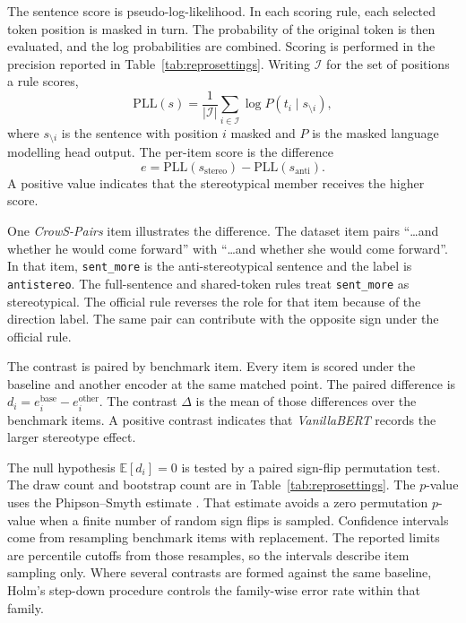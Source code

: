 \documentclass[sigconf,natbib=true,anonymous=true]{acmart}
\begin{document}
The sentence score is pseudo-log-likelihood. In each scoring rule, each selected
token position is masked in turn. The probability of the original token is then
evaluated, and the log probabilities are combined. Scoring is performed in the
precision reported in Table~\ref{tab:reprosettings}. Writing $\mathcal{I}$ for
the set of positions a rule scores,
%
\begin{equation}
\mathrm{PLL}(s) = \frac{1}{|\mathcal{I}|}
                  \sum_{i \in \mathcal{I}} \log P\!\left(t_i \mid s_{\setminus i}\right),
\end{equation}
%
where $s_{\setminus i}$ is the sentence with position $i$ masked and $P$ is the
masked language modelling head output. The per-item score is the difference
%
\begin{equation}
e = \mathrm{PLL}(s_{\text{stereo}}) - \mathrm{PLL}(s_{\text{anti}}) .
\end{equation}
%
A positive value indicates that the stereotypical member receives the higher score.


One \emph{CrowS-Pairs} item illustrates the difference. The dataset item pairs
``\ldots{}and whether he would come forward'' with ``\ldots{}and whether she
would come forward''. In that item, \texttt{sent\_more} is the
anti-stereotypical sentence and the label is \texttt{antistereo}. The
full-sentence and shared-token rules treat \texttt{sent\_more} as
stereotypical. The official rule reverses the role for that item because of the
direction label. The same pair can contribute with the opposite sign
under the official rule.

The contrast is paired by benchmark item. Every item is scored under the
baseline and another encoder at the same matched point. The paired difference is
$d_i = e_i^{\text{base}} - e_i^{\text{other}}$. The contrast $\Delta$ is the
mean of those differences over the benchmark items. A positive contrast
indicates that \emph{VanillaBERT} records the larger stereotype effect.

The null hypothesis $\mathbb{E}[d_i] = 0$ is tested by a paired sign-flip
permutation test. The draw count and bootstrap count are in
Table~\ref{tab:reprosettings}. The $p$-value uses the Phipson--Smyth estimate
\citep{phipson2010permutation}. That estimate avoids a zero permutation
$p$-value when a finite number of random sign flips is sampled. Confidence
intervals come from resampling benchmark items with replacement. The reported
limits are percentile cutoffs from those resamples, so the intervals describe
item sampling only. Where several contrasts are formed against the same
baseline, Holm's step-down procedure controls the family-wise error rate within
that family.
\end{document}
